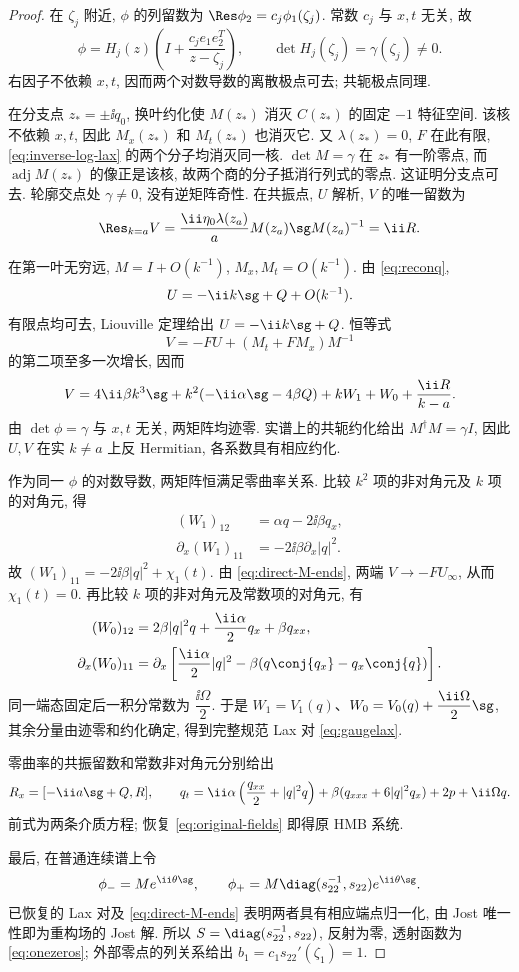 \begin{proof}
在 $\zeta_j$ 附近, $\phi$ 的列留数为 $\Res\phi_2=c_j\phi_1(\zeta_j)$. 常数 $c_j$ 与 $x,t$ 无关, 故
\[
\phi=H_j(z)\left(I+\dfrac{c_je_1e_2^T}{z-\zeta_j}\right),\qquad
\det H_j(\zeta_j)=\gamma(\zeta_j)\ne0.
\]
右因子不依赖 $x,t$, 因而两个对数导数的离散极点可去; 共轭极点同理.

在分支点 $z_*=\pm\ii q_0$, 换叶约化使 $M(z_*)$ 消灭 $C(z_*)$ 的固定 $-1$ 特征空间. 该核不依赖 $x,t$, 因此 $M_x(z_*)$ 和 $M_t(z_*)$ 也消灭它. 又 $\lambda(z_*)=0$, $F$ 在此有限, \eqref{eq:inverse-log-lax} 的两个分子均消灭同一核. $\det M=\gamma$ 在 $z_*$ 有一阶零点, 而 $\operatorname{adj}M(z_*)$ 的像正是该核, 故两个商的分子抵消行列式的零点. 这证明分支点可去. 轮廓交点处 $\gamma\ne0$, 没有逆矩阵奇性. 在共振点, $U$ 解析, $V$ 的唯一留数为
\[
\Res_{k=a}V=\dfrac{\ii\eta_0\lambda(z_a)}{a}M(z_a)\sg M(z_a)^{-1}=\ii R.
\]

在第一叶无穷远, $M=I+O(k^{-1})$, $M_x,M_t=O(k^{-1})$. 由 \eqref{eq:reconq},
\[
U=-\ii k\sg+Q+O(k^{-1}).
\]
有限点均可去, Liouville 定理给出 $U=-\ii k\sg+Q$. 恒等式
\[
V=-FU+(M_t+FM_x)M^{-1}
\]
的第二项至多一次增长, 因而
\begin{equation}\label{eq:inverse-V-form}
V=4\ii\beta k^3\sg+k^2(-\ii\alpha\sg-4\beta Q)
+kW_1+W_0+\dfrac{\ii R}{k-a}.
\end{equation}
由 $\det\phi=\gamma$ 与 $x,t$ 无关, 两矩阵均迹零. 实谱上的共轭约化给出 $M^\dagger M=\gamma I$, 因此 $U,V$ 在实 $k\ne a$ 上反 Hermitian, 各系数具有相应约化.

作为同一 $\phi$ 的对数导数, 两矩阵恒满足零曲率关系. 比较 $k^2$ 项的非对角元及 $k$ 项的对角元, 得
\[
\begin{aligned}
(W_1)_{12}&=\alpha q-2\ii\beta q_x,\\
\partial_x(W_1)_{11}&=-2\ii\beta\partial_x|q|^2.
\end{aligned}
\]
故 $(W_1)_{11}=-2\ii\beta|q|^2+\chi_1(t)$. 由 \eqref{eq:direct-M-ends}, 两端 $V\to-FU_\infty$, 从而 $\chi_1(t)=0$. 再比较 $k$ 项的非对角元及常数项的对角元, 有
\[
\begin{aligned}
(W_0)_{12}&=2\beta|q|^2q+\dfrac{\ii\alpha}{2}q_x+\beta q_{xx},\\
\partial_x(W_0)_{11}&=\partial_x\left[\dfrac{\ii\alpha}{2}|q|^2-\beta(q\conj{q_x}-q_x\conj{q})\right].
\end{aligned}
\]
同一端态固定后一积分常数为 $\dfrac{\ii\Omega}{2}$. 于是 $W_1=V_1(q)$、$W_0=V_0(q)+\dfrac{\ii\Omega}{2}\sg$, 其余分量由迹零和约化确定, 得到完整规范 Lax 对 \eqref{eq:gaugelax}.

零曲率的共振留数和常数非对角元分别给出
\[
R_x=[-\ii a\sg+Q,R],\qquad
q_t=\ii\alpha\left(\dfrac{q_{xx}}{2}+|q|^2q\right)
+\beta(q_{xxx}+6|q|^2q_x)+2p+\ii\Omega q.
\]
前式为两条介质方程; 恢复 \eqref{eq:original-fields} 即得原 HMB 系统.

最后, 在普通连续谱上令
\[
\phi_-=Me^{\ii\theta\sg},\qquad
\phi_+=M\diag(s_{22}^{-1},s_{22})e^{\ii\theta\sg}.
\]
已恢复的 Lax 对及 \eqref{eq:direct-M-ends} 表明两者具有相应端点归一化, 由 Jost 唯一性即为重构场的 Jost 解. 所以 $S=\diag(s_{22}^{-1},s_{22})$, 反射为零, 透射函数为 \eqref{eq:onezeros}; 外部零点的列关系给出 $b_1=c_1s_{22}'(\zeta_1)=1$.
\end{proof}

